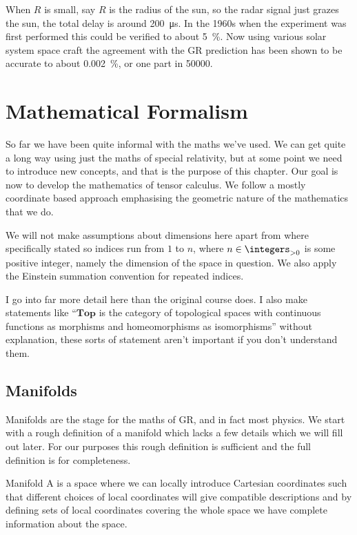 \documentclass[fleqn]{NotesClass}
\newcommand*{\category}[1]{\mathbf{#1}}
\begin{document}
    When \(R\) is small, say \(R\) is the radius of the sun, so the radar signal just grazes the sun, the total delay is around \qty{200}{\micro\second}.
    In the 1960s when the experiment was first performed this could be verified to about \qty{5}{\percent}.
    Now using various solar system space craft the agreement with the GR prediction has been shown to be accurate to about \qty{0.002}{\percent}, or one part in \num{50000}.
    
    \chapter{Mathematical Formalism}
    So far we have been quite informal with the maths we've used.
    We can get quite a long way using just the maths of special relativity, but at some point we need to introduce new concepts, and that is the purpose of this chapter.
    Our goal is now to develop the mathematics of tensor calculus.
    We follow a mostly coordinate based approach emphasising the geometric nature of the mathematics that we do.
    
    We will not make assumptions about dimensions here apart from where specifically stated so indices run from \(1\) to \(n\), where \(n \in \integers_{>0}\) is some positive integer, namely the dimension of the space in question.
    We also apply the Einstein summation convention for repeated indices.
    
    I go into far more detail here than the original course does.
    I also make statements like \enquote{\(\category{Top}\) is the category of topological spaces with continuous functions as morphisms and homeomorphisms as isomorphisms} without explanation, these sorts of statement aren't important if you don't understand them.
    
    \section{Manifolds}
    Manifolds are the stage for the maths of GR, and in fact most physics.
    We start with a rough definition of a manifold which lacks a few details which we will fill out later.
    For our purposes this rough definition is sufficient and the full definition is for completeness.
    \begin{dfn}{Manifold}{}
        A  is a space where we can locally introduce Cartesian coordinates such that different choices of local coordinates will give compatible descriptions and by defining sets of local coordinates covering the whole space we have complete information about the space.
    \end{dfn}
    
\end{document}
